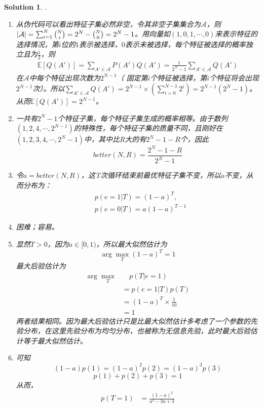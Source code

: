 \documentclass[a4paper,UTF8]{article}
\newtheorem*{solution}{Solution}
\numberwithin{equation}{section}
\begin{document}
\begin{solution}.
\begin{enumerate}[$(1)$]
	\item 从伪代码可以看出特征子集必然非空，令其非空子集集合为$\mathcal{A}$，则$|\mathcal{A}|=\sum_{i=1}^{N}\tbinom{N}{i}=2^N-\tbinom{N}{0}=2^N-1$。用向量如$(1,0,1,\cdots,0)$来表示特征的选择情况，第$i$位的$1$表示被选择，$0$表示未被选择，每个特征被选择的概率独立且为$\frac{1}{2}$，则
	\begin{align*}
	 \mathbb{E}[Q(A')]=\sum_{A'\in\mathcal{A}}P(A')Q(A')=\frac{1}{2^N-1}\sum_{A'\in\mathcal{A}}Q(A')
	\end{align*}
    在$\mathcal{A}$中每个特征出现次数为$2^{N-1}$（ 固定第$i$个特征被选择，第$i$个特征将会出现$2^{N-1}$次）。所以$\sum_{A'\in\mathcal{A}}Q(A')=2^{N-1}\times(\sum_{i=0}^{N-1}2^i)=2^{N-1}(2^{N}-1)$。从而$\mathbb{E}[Q(A')]=2^{N-1}$。
    \item 一共有$2^N-1$个特征子集，每个特征子集生成的概率相等。由于数列$(1,2,4,\cdots,2^{N-1})$的特殊性，每个特征子集的质量不同，且刚好在$(1,2,3,4,\cdots,2^N-1)$中，其中比R大的有$2^N-1-R$个，因此
    $$better(N,R)=\frac{2^N-1-R}{2^N-1}$$
    \item 令$a=better(N,R)$，这T次循环结束前最优特征子集不变，所以$a$不变，从而分布为：
           \begin{align*}
           &p(e=1|T)=(1-a)^{T},\\
           &p(e=0|T)=a(1-a)^{T-1}
           \end{align*}
    \item 困难；容易。
    \item 显然$T>0$，因为$a\in[0,1)$，所以最大似然估计为$$\arg\max_T (1-a)^T=1$$
          最大后验估计为
          \begin{align*}
          	\arg\max_T &\quad p(T|e=1)\\
          	           &=p(e=1|T)p(T)\\
          	                   &=(1-a)^T\times\frac{1}{10}\\
          	                   &=1
          \end{align*}
          两者结果相同。因为最大后验估计只是比最大似然估计多考虑了一个参数的先验分布，在这里先验分布为均匀分布，也被称为无信息先验，此时最大后验估计等于最大似然估计。
     \item 
         可知$$(1-a)p(1)=(1-a)^2p(2)=(1-a)^3p(3)$$$$p(1)+p(2)+p(3)=1$$
         从而，
         \begin{align*}
         	p(T=1)&=\frac{(1-a)^2}{a^2-3a+3}\\

\end{align*}
\end{enumerate}
\end{solution}
\end{document}
